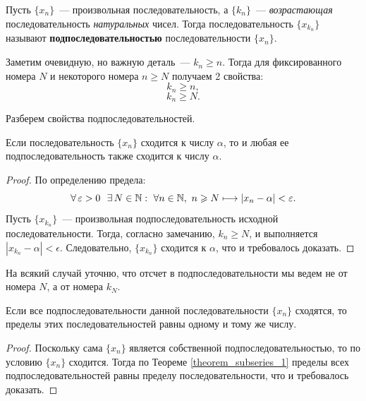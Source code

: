 

\begin{definition}
Пусть \(\{x_{n}\}\)~--- произвольная последовательность,
а \(\{k_{n}\}\)~--- \textit{возрастающая} последовательность \textit{натуральных} чисел.
Тогда последовательность \(\{x_{k_{n}}\}\) называют \textbf{подпоследовательностью}
последовательности \(\{x_{n}\}\).
\end{definition}

\begin{note}
Заметим очевидную, но важную деталь~--- \(k_{n}\geq n\).
Тогда для фиксированного номера \(N\) и некоторого номера \(n\geq N\)
получаем 2 свойства:
\[
k_{n} \geq n,
\]
\[
k_{n} \geq N.
\]
\end{note}

Разберем свойства подпоследовательностей.

\begin{theorem} \label{theorem_subseries_1}
Если последовательность \(\{x_{n}\}\) сходится к числу \(\alpha\),
то и любая ее подпоследовательность также сходится к числу \(\alpha\).

\begin{proof}
По определению предела:
\[
\forall \, \varepsilon > 0 ~~ \exists \, N \in \mathbb{N}:
~ \forall n \in \mathbb{N}, ~ n \geqslant N \longmapsto |x_{n} - \alpha| < \varepsilon.
\]
Пусть \(\{x_{k_{n}}\}\)~--- произвольная подпоследовательность исходной последовательности.
Тогда, согласно замечанию, \(k_{n} \geq N\), и выполняется \(|x_{k_{n}} - \alpha| < \epsilon\).
Следовательно, \(\{x_{k_{n}}\}\) сходится к \(\alpha\), что и требовалось доказать.
\end{proof}

\begin{anote}
На всякий случай уточню, что отсчет в подпоследовательности мы ведем
не от номера \(N\), а от номера \(k_{N}\).
\end{anote}

\end{theorem}

\begin{theorem}
Если все подпоследовательности данной последовательности \(\{x_{n}\}\) сходятся,
то пределы этих последовательностей равны одному и тому же числу.

\begin{proof}
Поскольку сама \(\{x_{n}\}\) является собственной подпоследовательностью,
то по условию \(\{x_{n}\}\) сходится. Тогда по Теореме \ref{theorem_subseries_1} пределы всех
подпоследовательностей равны пределу последовательности, что и требовалось доказать.
\end{proof}
\end{theorem}

